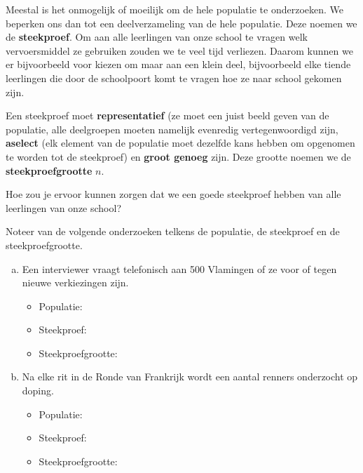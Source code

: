 \documentclass[12pt,twoside]{article}
\begin{document}
Meestal is het onmogelijk of moeilijk om de hele populatie te onderzoeken. We beperken ons dan tot een deelverzameling van de hele populatie. Deze noemen we de {\bf steekproef}. Om aan alle leerlingen van onze school te vragen welk vervoersmiddel ze gebruiken zouden we te veel tijd verliezen. Daarom kunnen we er bijvoorbeeld voor kiezen om maar aan een klein deel, bijvoorbeeld elke tiende leerlingen die door de schoolpoort komt te vragen hoe ze naar school gekomen zijn.

Een steekproef moet {\bf representatief} (ze moet een juist beeld geven van de populatie, alle deelgroepen moeten namelijk evenredig vertegenwoordigd zijn, {\bf aselect} (elk element van de populatie moet dezelfde kans hebben om opgenomen te worden tot de steekproef) en {\bf groot genoeg} zijn. Deze grootte noemen we de {\bf steekproefgrootte} $n$.

\begin{oefening}
Hoe zou je ervoor kunnen zorgen dat we een goede steekproef hebben van alle leerlingen van onze school?
\end{oefening}


\begin{oefening}
Noteer van de volgende onderzoeken telkens de populatie, de steekproef en de steekproefgrootte.
\begin{enumerate}[(a)]
  \item Een interviewer vraagt telefonisch aan 500 Vlamingen of ze voor of tegen nieuwe verkiezingen zijn.
  \begin{itemize}
    \itemsep0.5em
    \item Populatie: \arulefill
    \item Steekproef: \arulefill
    \item Steekproefgrootte: \arulefill
  \end{itemize}
  \item Na elke rit in de Ronde van Frankrijk wordt een aantal renners onderzocht op doping.
  \begin{itemize}
    \itemsep0.5em
    \item Populatie: \arulefill
    \item Steekproef: \arulefill
    \item Steekproefgrootte: \arulefill
  \end{itemize}
\end{enumerate}
\end{oefening}
\end{document}
